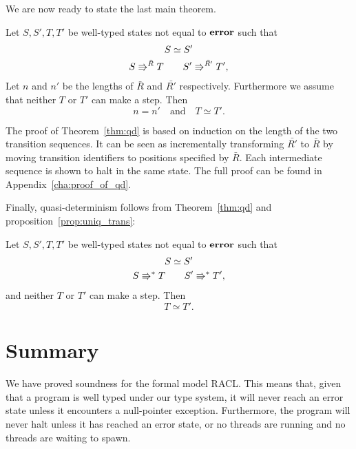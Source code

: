 We are now ready to state the last main theorem.

\begin{theorem} \label{thm:qd}
  Let $S, S', T, T'$ be well-typed states not equal to $\mbox{{\bf error}}$ such that
  \begin{equation*}
    \begin{gathered}
      S \simeq S' \\
      S \Rrightarrow^{\bar{R}} T \quad\quad S' \Rrightarrow^{\bar{R'}} T',
    \end{gathered}
  \end{equation*}
  Let $n$ and $n'$ be the lengths of $\bar{R}$ and $\bar{R'}$ respectively.
  Furthermore we assume that neither $T$ or $T'$ can make a step. Then
  \begin{equation*}
    n = n' \quad \text{and} \quad T \simeq T'.
  \end{equation*}
\end{theorem}

The proof of Theorem~\ref{thm:qd} is based on induction on the length of the two
transition sequences. It can be seen as incrementally transforming $\bar{R'}$ to
$\bar{R}$ by moving transition identifiers to positions specified by $\bar{R}$.
Each intermediate sequence is shown to halt in the same state. The full proof
can be found in Appendix~\ref{cha:proof_of_qd}.

Finally, quasi-determinism follows from Theorem~\ref{thm:qd} and
proposition~\ref{prop:uniq_trans}:
\begin{corollary}
  Let $S, S', T, T'$ be well-typed states not equal to $\mbox{{\bf error}}$ such that
  \begin{equation*}
    \begin{gathered}
      S \simeq S' \\
      S \Rrightarrow^* T \quad\quad S' \Rrightarrow^* T',
    \end{gathered}
  \end{equation*}
  and neither $T$ or $T'$ can make a step.  Then
  \begin{equation*}
    T \simeq T'.
  \end{equation*}
\end{corollary}

\section{Summary}%
\label{sec:summary}

We have proved soundness for the formal model RACL. This means that, given that
a program is well typed under our type system, it will never reach an
error state unless it encounters a null-pointer exception. Furthermore, the
program will never halt unless it has reached an error state, or no threads are
running and no threads are waiting to spawn.

